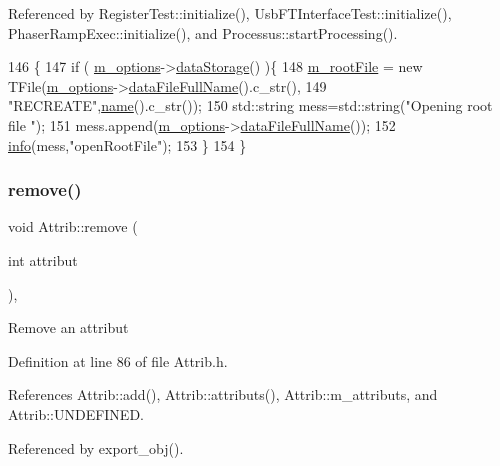 Referenced by Register\+Test\+::initialize(), Usb\+F\+T\+Interface\+Test\+::initialize(), Phaser\+Ramp\+Exec\+::initialize(), and Processus\+::start\+Processing().


\begin{DoxyCode}
146                                \{
147   \textcolor{keywordflow}{if} ( \hyperlink{classProcessus_a74205f3c1e00c4448f7b3257c2351797}{m\_options}->\hyperlink{classOptions_aed7799d10139fa542055b982cb820192}{dataStorage}() )\{
148     \hyperlink{classProcessus_a76114f8cf2111e910c323a7ae05a015d}{m\_rootFile} = \textcolor{keyword}{new} TFile(\hyperlink{classProcessus_a74205f3c1e00c4448f7b3257c2351797}{m\_options}->\hyperlink{classOptions_ab1cd9f237e9c18fd72323c74565453f8}{dataFileFullName}().c\_str(),
149                            \textcolor{stringliteral}{"RECREATE"},\hyperlink{classObject_a300f4c05dd468c7bb8b3c968868443c1}{name}().c\_str());
150         std::string mess=std::string(\textcolor{stringliteral}{"Opening root file "});
151         mess.append(\hyperlink{classProcessus_a74205f3c1e00c4448f7b3257c2351797}{m\_options}->\hyperlink{classOptions_ab1cd9f237e9c18fd72323c74565453f8}{dataFileFullName}());
152         \hyperlink{classObject_a644fd329ea4cb85f54fa6846484b84a8}{info}(mess,\textcolor{stringliteral}{"openRootFile"});
153   \}
154 \}
\end{DoxyCode}
\mbox{\label{classAttrib_a7d4ef7e32d93cb287792b87b857e79f3}} 
\subsubsection{\texorpdfstring{remove()}{remove()}}
{\footnotesize\ttfamily void Attrib\+::remove (\begin{DoxyParamCaption}\item[{int}]{attribut }\end{DoxyParamCaption})\hspace{0.3cm}{\ttfamily [inline]}, {\ttfamily [inherited]}}

Remove an attribut 

Definition at line 86 of file Attrib.\+h.



References Attrib\+::add(), Attrib\+::attributs(), Attrib\+::m\+\_\+attributs, and Attrib\+::\+U\+N\+D\+E\+F\+I\+N\+ED.



Referenced by export\+\_\+obj().


